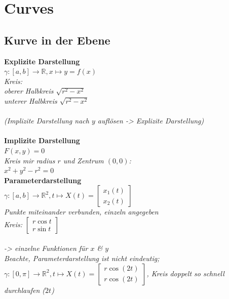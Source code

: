 \section{Curves}

\subsection{Kurve in der Ebene}

\textbf{Explizite Darstellung} \\
$\gamma : [a,b] \rightarrow \mathbb{R} , x \mapsto y = f(x)$ \\
\textit{Kreis: \\oberer Halbkreis $\sqrt{r^2 - x^2}$ \\ unterer Halbkreis $\sqrt{r^2 - x^2}$} \\
\\
\textit{(Implizite Darstellung nach $y$ auflösen -> Explizite Darstellung)}\\
\\
\textbf{Implizite Darstellung} \\
$F(x,y) = 0$ \\
\textit{Kreis mir radius $r$ und Zentrum $(0,0)$:} \\
\textit{$x^2 + y^2 - r^2 = 0$}
\\
\textbf{Parameterdarstellung} \\
$\gamma : [a,b] \rightarrow \mathbb{R}^2,t \mapsto X(t) = \begin{bmatrix} x_1(t) \\ x_2(t) \end{bmatrix}$ \\
\textit{Punkte miteinander verbunden, einzeln angegeben} \\
\textit{Kreis: $\begin{bmatrix} r \cos t \\ r \sin t \end{bmatrix}$}\\
\\
\textit{-> einzelne Funktionen für $x$ \& $y$}\\

\textit{Beachte, Parameterdarstellung ist nicht eindeutig;}\\
\textit{$\gamma : [0,\pi] \rightarrow \mathbb{R}^2,t \mapsto X(t) =
\begin{bmatrix}
    r \cos(2t) \\ r \cos(2t)
\end{bmatrix}$, Kreis doppelt so schnell durchlaufen ($2t$)}

